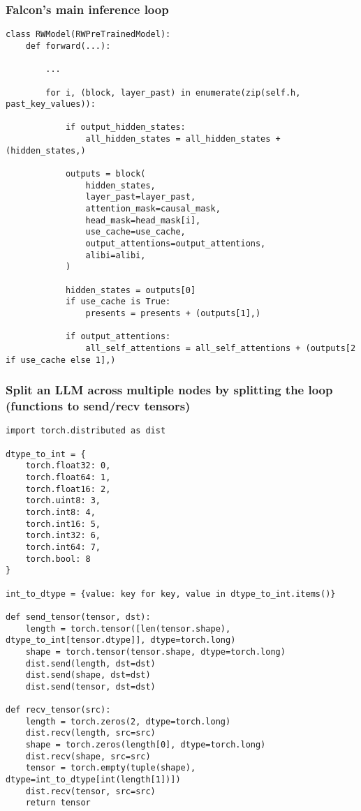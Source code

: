 \documentclass{beamer}
\begin{document}
\begin{frame}[fragile]
\frametitle{Falcon's main inference loop}
\tiny\begin{verbatim}
class RWModel(RWPreTrainedModel):
    def forward(...):

        ...

        for i, (block, layer_past) in enumerate(zip(self.h, past_key_values)):

            if output_hidden_states:
                all_hidden_states = all_hidden_states + (hidden_states,)

            outputs = block(
                hidden_states,
                layer_past=layer_past,
                attention_mask=causal_mask,
                head_mask=head_mask[i],
                use_cache=use_cache,
                output_attentions=output_attentions,
                alibi=alibi,
            )

            hidden_states = outputs[0]
            if use_cache is True:
                presents = presents + (outputs[1],)

            if output_attentions:
                all_self_attentions = all_self_attentions + (outputs[2 if use_cache else 1],)

\end{verbatim}
\end{frame}

\begin{frame}[fragile]
\frametitle{Split an LLM across multiple nodes by splitting the loop (functions to send/recv tensors)}
\tiny\begin{verbatim}
import torch.distributed as dist

dtype_to_int = {
    torch.float32: 0,
    torch.float64: 1,
    torch.float16: 2,
    torch.uint8: 3,
    torch.int8: 4,
    torch.int16: 5,
    torch.int32: 6,
    torch.int64: 7,
    torch.bool: 8
}

int_to_dtype = {value: key for key, value in dtype_to_int.items()}

def send_tensor(tensor, dst):
    length = torch.tensor([len(tensor.shape), dtype_to_int[tensor.dtype]], dtype=torch.long)
    shape = torch.tensor(tensor.shape, dtype=torch.long)
    dist.send(length, dst=dst)
    dist.send(shape, dst=dst)
    dist.send(tensor, dst=dst)

def recv_tensor(src):
    length = torch.zeros(2, dtype=torch.long)
    dist.recv(length, src=src)
    shape = torch.zeros(length[0], dtype=torch.long)
    dist.recv(shape, src=src)
    tensor = torch.empty(tuple(shape), dtype=int_to_dtype[int(length[1])])
    dist.recv(tensor, src=src)
    return tensor

\end{verbatim}
\end{frame}
\end{document}
